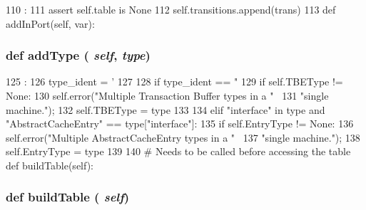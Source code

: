 \begin{DoxyCode}
110                                   :
111         assert self.table is None
112         self.transitions.append(trans)
113 
    def addInPort(self, var):
\end{DoxyCode}
\hypertarget{classslicc_1_1symbols_1_1StateMachine_1_1StateMachine_a1d3434788e322f0a2d8c45cb6d4a6cf9}{
\subsubsection[{addType}]{\setlength{\rightskip}{0pt plus 5cm}def addType ( {\em self}, \/   {\em type})}}
\label{classslicc_1_1symbols_1_1StateMachine_1_1StateMachine_a1d3434788e322f0a2d8c45cb6d4a6cf9}



\begin{DoxyCode}
125                            :
126         type_ident = '%
127 
128         if type_ident == "%
129             if self.TBEType != None:
130                 self.error("Multiple Transaction Buffer types in a " \
131                            "single machine.");
132             self.TBEType = type
133 
134         elif "interface" in type and "AbstractCacheEntry" == type["interface"]:
135             if self.EntryType != None:
136                 self.error("Multiple AbstractCacheEntry types in a " \
137                            "single machine.");
138             self.EntryType = type
139 
140     # Needs to be called before accessing the table
    def buildTable(self):
\end{DoxyCode}
\hypertarget{classslicc_1_1symbols_1_1StateMachine_1_1StateMachine_a3f3cff659e075a9c68c3ed38d1c739cd}{
\subsubsection[{buildTable}]{\setlength{\rightskip}{0pt plus 5cm}def buildTable ( {\em self})}}
\label{classslicc_1_1symbols_1_1StateMachine_1_1StateMachine_a3f3cff659e075a9c68c3ed38d1c739cd}



